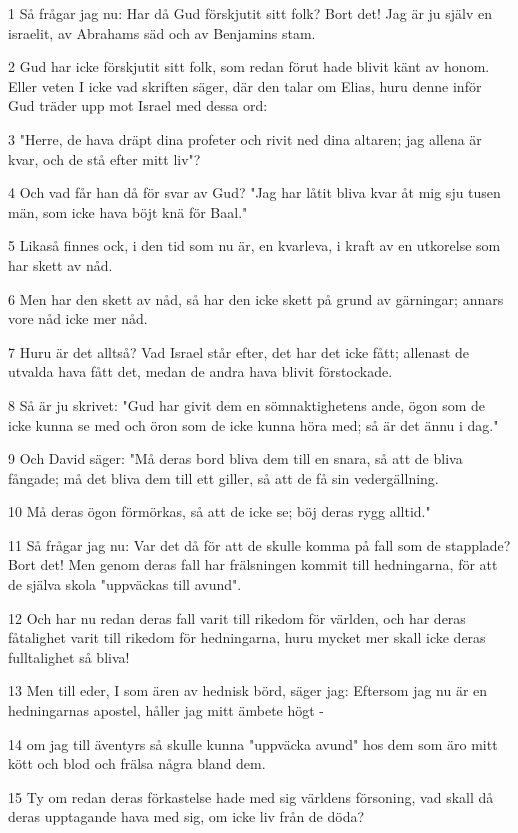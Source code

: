 \par 1 Så frågar jag nu: Har då Gud förskjutit sitt folk? Bort det! Jag är ju själv en israelit, av Abrahams säd och av Benjamins stam.
\par 2 Gud har icke förskjutit sitt folk, som redan förut hade blivit känt av honom. Eller veten I icke vad skriften säger, där den talar om Elias, huru denne inför Gud träder upp mot Israel med dessa ord:
\par 3 "Herre, de hava dräpt dina profeter och rivit ned dina altaren; jag allena är kvar, och de stå efter mitt liv"?
\par 4 Och vad får han då för svar av Gud? "Jag har låtit bliva kvar åt mig sju tusen män, som icke hava böjt knä för Baal."
\par 5 Likaså finnes ock, i den tid som nu är, en kvarleva, i kraft av en utkorelse som har skett av nåd.
\par 6 Men har den skett av nåd, så har den icke skett på grund av gärningar; annars vore nåd icke mer nåd.
\par 7 Huru är det alltså? Vad Israel står efter, det har det icke fått; allenast de utvalda hava fått det, medan de andra hava blivit förstockade.
\par 8 Så är ju skrivet: "Gud har givit dem en sömnaktighetens ande, ögon som de icke kunna se med och öron som de icke kunna höra med; så är det ännu i dag."
\par 9 Och David säger: "Må deras bord bliva dem till en snara, så att de bliva fångade; må det bliva dem till ett giller, så att de få sin vedergällning.
\par 10 Må deras ögon förmörkas, så att de icke se; böj deras rygg alltid."
\par 11 Så frågar jag nu: Var det då för att de skulle komma på fall som de stapplade? Bort det! Men genom deras fall har frälsningen kommit till hedningarna, för att de själva skola "uppväckas till avund".
\par 12 Och har nu redan deras fall varit till rikedom för världen, och har deras fåtalighet varit till rikedom för hedningarna, huru mycket mer skall icke deras fulltalighet så bliva!
\par 13 Men till eder, I som ären av hednisk börd, säger jag: Eftersom jag nu är en hedningarnas apostel, håller jag mitt ämbete högt -
\par 14 om jag till äventyrs så skulle kunna "uppväcka avund" hos dem som äro mitt kött och blod och frälsa några bland dem.
\par 15 Ty om redan deras förkastelse hade med sig världens försoning, vad skall då deras upptagande hava med sig, om icke liv från de döda?
